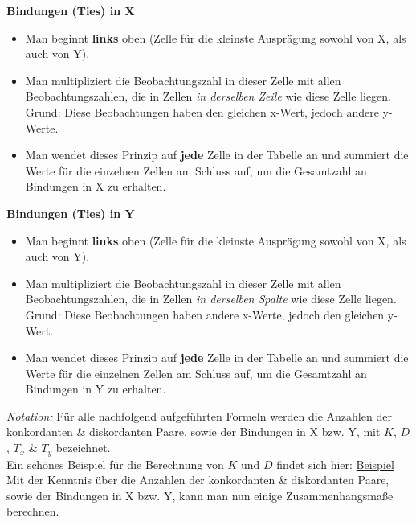 \documentclass[a4paper]{article}
\newcommand\dangersign[1][2ex]{%
  \renewcommand\stacktype{L}%
  \scaleto{\stackon[1.3pt]{\color{red}$\triangle$}{\tiny !}}{#1}%
}
\begin{document}
\noindent \textbf{Bindungen (Ties) in X}
\begin{itemize}
    \item Man beginnt \textbf{links} oben (Zelle für die kleinste Ausprägung sowohl von X, als auch von Y).
    \item Man multipliziert die Beobachtungszahl in dieser Zelle mit allen Beobachtungszahlen, die in Zellen \textit{in derselben Zeile} wie diese Zelle liegen.\\
    Grund: Diese Beobachtungen haben den gleichen x-Wert, jedoch andere y-Werte.
    \item Man wendet dieses Prinzip auf \textbf{jede} Zelle in der Tabelle an und summiert die Werte für die einzelnen Zellen am Schluss auf, um die Gesamtzahl an Bindungen in X zu erhalten.
\end{itemize}

\noindent \textbf{Bindungen (Ties) in Y}
\begin{itemize}
    \item Man beginnt \textbf{links} oben (Zelle für die kleinste Ausprägung sowohl von X, als auch von Y).
    \item Man multipliziert die Beobachtungszahl in dieser Zelle mit allen Beobachtungszahlen, die in Zellen \textit{in derselben Spalte} wie diese Zelle liegen.\\
    Grund: Diese Beobachtungen haben andere x-Werte, jedoch den gleichen y-Wert.
    \item Man wendet dieses Prinzip auf \textbf{jede} Zelle in der Tabelle an und summiert die Werte für die einzelnen Zellen am Schluss auf, um die Gesamtzahl an Bindungen in Y zu erhalten.
\end{itemize}

\noindent \dangersign[3ex] \textit{Notation:} Für alle nachfolgend aufgeführten Formeln werden die Anzahlen der konkordanten \& diskordanten Paare, sowie der Bindungen in X bzw. Y, mit $K$, $D$, $T_x$ \& $T_y$ bezeichnet.\\

\noindent Ein schönes Beispiel für die Berechnung von $K$ und $D$ findet sich hier: \hfill \href{https://support.minitab.com/de-de/minitab/19/help-and-how-to/statistics/tables/supporting-topics/other-statistics-and-tests/what-are-concordant-and-discordant-pairs/}{Beispiel}\\

\noindent Mit der Kenntnis über die Anzahlen der konkordanten \& diskordanten Paare, sowie der Bindungen in X bzw. Y, kann man nun einige Zusammenhangsmaße berechnen.
\end{document}
